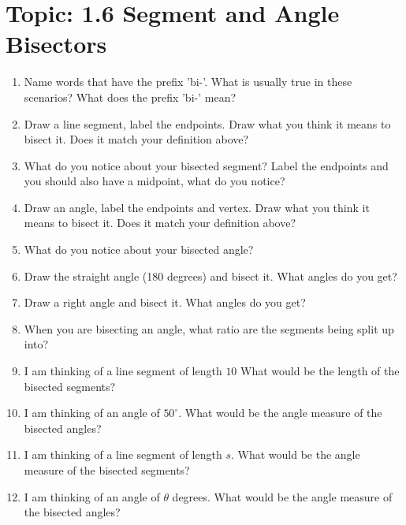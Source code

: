 \documentclass[12pt,letterpaper]{article}
\begin{document}
\section*{Topic: 1.6 Segment and Angle Bisectors}
\begin{enumerate}
    \item Name words that have the prefix 'bi-'. What is usually true in these scenarios? What does the prefix 'bi-' mean?
    \item Draw a line segment, label the endpoints. Draw what you think it means to bisect it. Does it match your definition above?
    \item What do you notice about your bisected segment? Label the endpoints and you should also have a midpoint, what do you notice?
    \item Draw an angle, label the endpoints and vertex. Draw what you think it means to bisect it. Does it match your definition above?
    \item What do you notice about your bisected angle?
    \item Draw the straight angle (180 degrees) and bisect it. What angles do you get?
    \item Draw a right angle and bisect it. What angles do you get?
    \item When you are bisecting an angle, what ratio are the segments being split up into?
    \item I am thinking of a line segment of length $10$ What would be the length of the bisected segments?
    \item I am thinking of an angle of $50^\circ$. What would be the angle measure of the bisected angles?
    \item I am thinking of a line segment of length $s$. What would be the angle measure of the bisected segments?
    \item I am thinking of an angle of $\theta$ degrees. What would be the angle measure of the bisected angles?
\end{enumerate}
\end{document}
